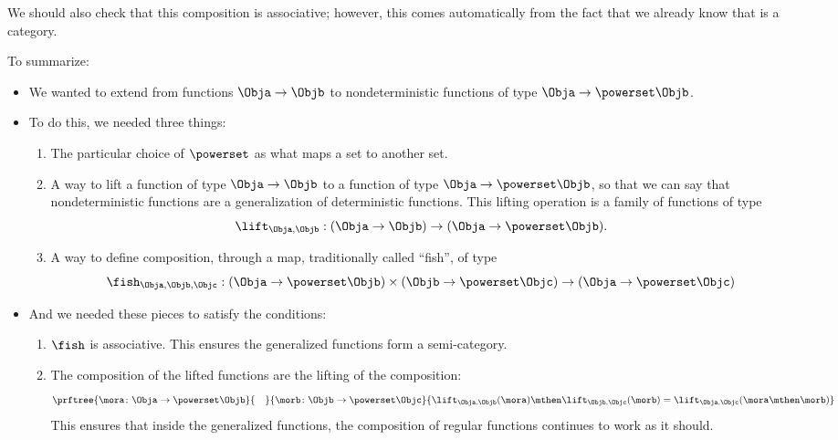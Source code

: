 We should also check that this composition is associative; however, this comes automatically from the fact that we already know that \Rel is a category. 

To summarize: 
\begin{itemize}
    \item We wanted to extend \Set from functions $\Obja \to \Objb$ to nondeterministic functions of type $\Obja \to \powerset\Objb$.
    \item To do this, we needed three things:
    \begin{enumerate}
        \item The particular choice of $\powerset$ as what maps a set to another set. 
    \item A way to lift a function of type $\Obja \to \Objb$ to a function of type $\Obja \to \powerset\Objb$, so that we can say that nondeterministic functions are a generalization of deterministic functions. This lifting operation is a family of functions of type 
    \begin{equation}\label{eq:monad-lift}
        \lift_{\Obja, \Objb}: (\Obja \to \Objb) \to (\Obja \to \powerset\Objb).
    \end{equation}
    \item A way to define composition, through a map, traditionally called ``fish'', of type
    \begin{equation}\label{eq:monad-fish}
        \fish_{\Obja, \Objb, \Objc}: (\Obja \to \powerset\Objb) \times (\Objb \to \powerset\Objc) 
        \to (\Obja \to \powerset \Objc)
    \end{equation}
\end{enumerate}
\item And we needed these pieces to satisfy the conditions:
\begin{enumerate}
    \item $\fish$ is associative. This ensures the generalized functions form a semi-category.
    \item The composition of the lifted functions are the lifting of the composition:
    \begin{equation}\label{eq:monad-fish-associative}
        \prftree{\mora\colon \Obja \to \powerset\Objb}{\quad}{\morb\colon \Objb \to \powerset \Objc}{
        \lift_{\Obja,\Objb}(\mora)\mthen\lift_{\Objb,\Objc}(\morb) =  \lift_{\Obja,\Objc}(\mora\mthen\morb)}
    \end{equation}
    This ensures that inside the generalized functions, the composition of regular functions continues to work as it should.
\end{enumerate}
\end{itemize}

